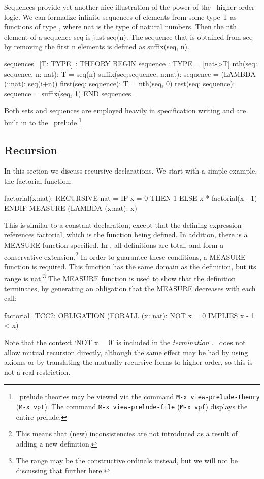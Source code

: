 Sequences provide yet another nice illustration of the power of the
\pvs\ higher-order logic.  We can formalize infinite sequences of
elements from some type {\stt T} as functions of type {\stt [nat ->
T]}, where {\stt nat} is the type of natural numbers.  Then the {\stt
n}th element of a sequence {\stt seq} is just {\stt seq(n)}.  The
sequence that is obtained from {\stt seq} by removing the first {\stt
n} elements is defined as {\stt suffix(seq, n)}.
\begin{pvsex}
  sequences\_[T: TYPE] : THEORY
   BEGIN
    sequence : TYPE = [nat->T]
    nth(seq: sequence, n: nat): T = seq(n)
    suffix(seq:sequence, n:nat): sequence =
      (LAMBDA (i:nat): seq(i+n))
    first(seq: sequence): T = nth(seq, 0)
    rest(seq: sequence): sequence = suffix(seq, 1)
   END sequences\_
\end{pvsex}
%
Both sets and sequences are employed heavily in specification
writing and are built in to the \pvs\ prelude.\footnote{\pvs\ prelude
theories may be viewed via the command {\tt M-x view-prelude-theory}
({\tt M-x vpt}). The command {\tt M-x view-prelude-file} ({\tt M-x vpf})
displays the entire prelude.}

\subsection{Recursion}

In this section we discuss recursive declarations.  We start with a
simple example, the factorial function:
\begin{pvsex}
  factorial(x:nat): RECURSIVE nat =
    IF x = 0 THEN 1 ELSE x * factorial(x - 1) ENDIF
    MEASURE (LAMBDA (x:nat): x)
\end{pvsex}
%
This is similar to a constant declaration, except that the defining
expression references {\stt factorial}, which is the function being
defined.  In addition, there is a {\stt MEASURE} function specified.
In \pvs, all definitions are total, and form a conservative
extension.\footnote{This means that (new) inconsistencies are not
introduced as a
result of adding a new definition.} In order to guarantee these
conditions, a {\stt MEASURE} function is required.  This function has the
same domain as the definition, but its range is {\stt nat}.\footnote{The
range may be the constructive ordinals instead, but we will not be
discussing that further here.} The {\stt MEASURE} function is used to
show that the definition terminates, by generating an obligation that
the {\stt MEASURE} decreases with each call:
\begin{pvsex}
  factorial_TCC2: OBLIGATION
    (FORALL (x: nat): NOT x = 0 IMPLIES x - 1 < x)
\end{pvsex}
%
Note that the context `{\stt NOT x = 0}' is included in the {\em
termination\/} \tcc.  \pvs\ does not allow mutual recursion directly,
although the same effect may be had by using axioms or by translating
the mutually recursive forms to higher order, so this is not a real
restriction.


